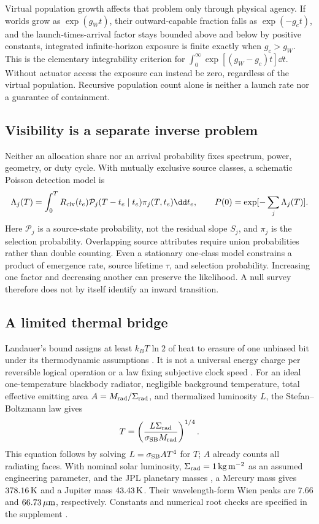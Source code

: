 Virtual population growth affects that problem only through physical
agency. If worlds grow as $\exp(g_Wt)$, their outward-capable fraction
falls as $\exp(-g_ct)$, and the launch-times-arrival factor stays bounded
above and below by positive constants, integrated infinite-horizon
exposure is finite exactly when $g_c>g_W$. This is the elementary
integrability criterion for $\int_0^\infty\exp[(g_W-g_c)t]\dd t$.
Without actuator access the exposure can instead be zero, regardless
of the virtual population. Recursive population count alone is neither
a launch rate nor a guarantee of containment.

\subsection{Visibility is a separate inverse problem}
Neither an allocation share nor an arrival probability fixes spectrum,
power, geometry, or duty cycle. With mutually exclusive source classes,
a schematic Poisson detection model is
\begin{equation}
 \Lambda_j(T)=\int_0^T R_{\rm civ}(t_e)
 \mathcal P_j(T-t_e\mid t_e)\pi_j(T,t_e)\dd t_e,
 \qquad P(0)=\exp[-\sum_j\Lambda_j(T)].
 \label{eq:observations}
\end{equation}
Here $\mathcal P_j$ is a source-state probability, not the residual slope
$S_j$, and $\pi_j$ is the selection probability. Overlapping source
attributes require union probabilities rather than double counting.
Even a stationary one-class model constrains a product of emergence
rate, source lifetime $\tau$, and selection probability. Increasing one
factor and decreasing another can preserve the likelihood. A null survey
therefore does not by itself identify an inward transition.

\subsection{A limited thermal bridge}
\label{sec:thermal-bridge}
Landauer's bound assigns at least $k_BT\ln2$ of heat to erasure of one
unbiased bit under its thermodynamic assumptions \citep{Landauer1961}.
It is not a universal energy charge per reversible logical operation or
a law fixing subjective clock speed \citep{Bennett1973}. For an ideal
one-temperature blackbody radiator, negligible background temperature,
total effective emitting area $A=M_{\rm rad}/\Sigma_{\rm rad}$, and
thermalized luminosity $L$, the Stefan--Boltzmann law gives
\begin{equation}
 T=\left(\frac{L\Sigma_{\rm rad}}{\sigma_{\rm SB}M_{\rm rad}}\right)^{1/4}.
 \label{eq:radiator}
\end{equation}
This equation follows by solving $L=\sigma_{\rm SB}AT^4$ for $T$;
$A$ already counts all radiating faces. With nominal solar luminosity,
$\Sigma_{\rm rad}=1\,{\rm kg\,m^{-2}}$ as an assumed engineering
parameter, and the JPL planetary masses \citep{JPLPhysical}, a Mercury
mass gives $378.16\,{\rm K}$ and a Jupiter mass $43.43\,{\rm K}$.
Their wavelength-form Wien peaks are $7.66$ and $66.73\,\mu{\rm m}$,
respectively. Constants and numerical root checks are specified in the
supplement \citep{NIST2022}.

